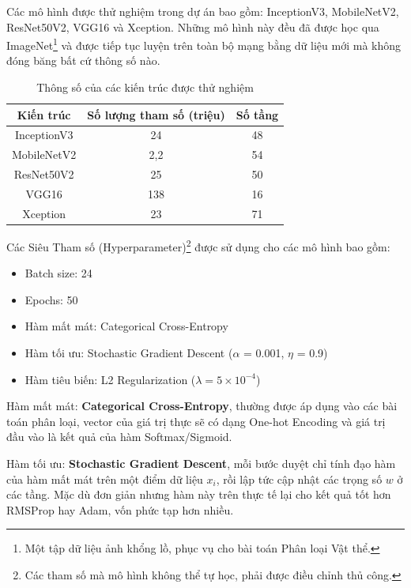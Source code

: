 \documentclass[a4paper,14pt]{extarticle}
\begin{document}
	Các mô hình được thử nghiệm trong dự án bao gồm: InceptionV3, MobileNetV2, ResNet50V2, VGG16 và Xception. Những mô hình này đều đã được học qua ImageNet\footnote{Một tập dữ liệu ảnh khổng lồ, phục vụ cho bài toán Phân loại Vật thể.} và được tiếp tục luyện trên toàn bộ mạng bằng dữ liệu mới mà không đóng băng bất cứ thông số nào.

	\begin{table}[H]
		\centering
		\begin{tabular}{|c|c|c|}
		\hline
		Kiến trúc   & Số lượng tham số (triệu) & Số tầng \\ \hline
		InceptionV3 & 24                       & 48      \\
		MobileNetV2 & 2,2                      & 54      \\
		ResNet50V2  & 25                       & 50      \\
		VGG16       & 138                      & 16      \\
		Xception    & 23                       & 71      \\ \hline
		\end{tabular}

		\caption{Thông số của các kiến trúc được thử nghiệm}
	\end{table}

	Các Siêu Tham số (Hyperparameter)\footnote{Các tham số mà mô hình không thể tự học, phải được điều chỉnh thủ công.} được sử dụng cho các mô hình bao gồm:

	\begin{itemize}
		\item Batch size: 24
		\item Epochs: 50
		\item Hàm mất mát: Categorical Cross-Entropy
		\item Hàm tối ưu: Stochastic Gradient Descent ($\alpha$ = 0.001, $\eta$ = 0.9)
		\item Hàm tiêu biến: L2 Regularization ($\lambda = 5 \times 10^{-4}$)
	\end{itemize}

	\null

	Hàm mất mát: \textbf{Categorical Cross-Entropy}, thường được áp dụng vào các bài toán phân loại, vector của giá trị thực sẽ có dạng One-hot Encoding và giá trị đầu vào là kết quả của hàm Softmax/Sigmoid.

	Hàm tối ưu: \textbf{Stochastic Gradient Descent}, mỗi bước duyệt chỉ tính đạo hàm của hàm mất mát trên một điểm dữ liệu $x_i$, rồi lập tức cập nhật các trọng số $w$ ở các tầng. Mặc dù đơn giản nhưng hàm này trên thực tế lại cho kết quả tốt hơn RMSProp hay Adam, vốn phức tạp hơn nhiều.
\end{document}
